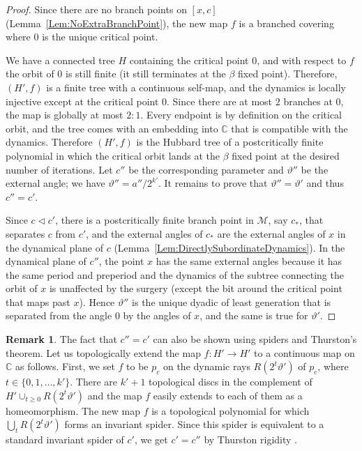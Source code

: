 \documentclass[12pt]{amsart}
\newcommand{\M}{\mathscr M}
\newcommand{\C}{\mathbb C}
\newcommand{\0}{\texttt{0}}
\newcommand{\1}{\texttt{1}}
\theoremstyle{definition}
\newtheorem*{remark}{Remark}
\numberwithin{equation}{section}
\renewcommand{\theta}{\vartheta}
\begin{document}
\begin{proof}
Since there are no branch points on $[x,c]$ (Lemma~\ref{Lem:NoExtraBranchPoint}), the new map $f$ is a branched covering where $0$ is the unique critical point.

We have a connected tree $H$ containing the critical point $0$, and with respect to $f$ the orbit of $0$ is still finite (it still terminates at the $\beta$ fixed point). Therefore, $(H',f)$ is a finite tree with a continuous self-map, and the dynamics is locally injective except at the critical point $0$. Since there are at most $2$ branches at $0$, the map is globally at most $2:1$. Every endpoint is by definition on the critical orbit, and the tree comes with an embedding into $\C$ that is compatible with the dynamics. Therefore $(H',f)$ is the Hubbard tree of a postcritically finite polynomial in which the critical orbit lands at the $\beta$ fixed point at the desired number of iterations.  Let $c''$ be the corresponding parameter and $\theta''$ be the external angle; we have $\theta''=a''/2^{k'}$.
It remains to prove that $\theta''=\theta'$ and thus $c''=c'$. 

Since $c\lhd c'$, there is a postcritically finite branch point in $\M$, say $c_*$, that separates $c$ from $c'$, and the external angles of $c_*$ are the external angles of $x$ in the dynamical plane of $c$ (Lemma~\ref{Lem:DirectlySubordinateDynamics}). In the dynamical plane of $c''$, the point $x$ has the same external angles because it has the same period and preperiod and the dynamics of the subtree connecting the orbit of $x$ is unaffected by the surgery (except the bit around the critical point that maps past $x$). Hence $\theta''$ is the unique dyadic of least generation that is separated from the angle $0$ by the angles of $x$, and the same is true for $\theta'$.
\end{proof}

\begin{remark}
The fact that $c''=c'$ can also be shown using spiders \cite{Spiders} and Thurston's theorem. Let us topologically extend the map $f:H' \to H'$ to a continuous map on $\C$ as follows. First, we set $f$ to be $p_c$ on the dynamic rays $R({2^{t}\theta'})$ of $p_c$, where $t\in\{0,1,\dots, k'\}$. There are $k'+1$ topological discs in the complement of $H'\cup_{t\ge 0} R({2^{t}\theta'})$ and the map $f$ easily extends to each of them as a homeomorphism. The new map $f$ is a topological polynomial for which $\bigcup_t R({2^{t}\theta'})$ forms an invariant spider. Since this spider is equivalent to a standard invariant spider of $c'$, we get $c'=c''$ by Thurston rigidity \cite{DHThurston,Spiders}.
\end{remark}
\end{document}
